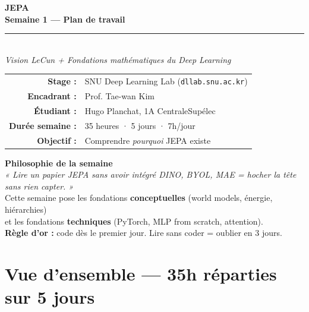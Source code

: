 \documentclass[a4paper,11pt]{article}
\begin{document}
\thispagestyle{empty}
\begin{center}
  \vspace*{1cm}
  {\Huge\bfseries\color{jepaBlue} JEPA}\\[0.3cm]
  {\Large\bfseries\color{darkGray} Semaine 1 — Plan de travail}\\[0.5cm]
  \textcolor{accentOrange}{\rule{8cm}{1.5pt}}\\[0.5cm]
  {\large\itshape Vision LeCun + Fondations mathématiques du Deep Learning}\\[1cm]
  \begin{tabular}{rl}
    \textbf{Stage :} & SNU Deep Learning Lab (\texttt{dllab.snu.ac.kr}) \\[4pt]
    \textbf{Encadrant :} & Prof. Tae-wan Kim \\[4pt]
    \textbf{Étudiant :} & Hugo Planchat, 1A CentraleSupélec \\[4pt]
    \textbf{Durée semaine :} & 35 heures · 5 jours · 7h/jour \\[4pt]
    \textbf{Objectif :} & Comprendre \textit{pourquoi} JEPA existe \\
  \end{tabular}

  \vspace{1.5cm}
  \begin{tcolorbox}[colback=lightBlue, colframe=jepaBlue, width=13cm, sharp corners]
    \centering
    \textbf{\color{jepaBlue} Philosophie de la semaine}\\[4pt]
    \textit{« Lire un papier JEPA sans avoir intégré DINO, BYOL, MAE = hocher la tête sans rien capter. »}\\[4pt]
    Cette semaine pose les fondations \textbf{conceptuelles} (world models, énergie, hiérarchies)\\
    et les fondations \textbf{techniques} (PyTorch, MLP from scratch, attention).\\[4pt]
    \textbf{Règle d'or :} code dès le premier jour. Lire sans coder = oublier en 3 jours.
  \end{tcolorbox}
\end{center}

\newpage

\section{Vue d'ensemble — 35h réparties sur 5 jours}
\end{document}
